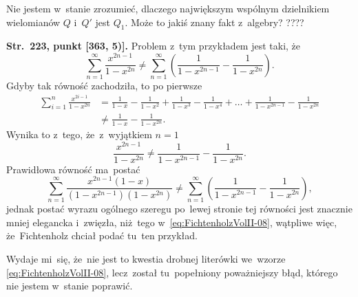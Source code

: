 \documentclass[a4paper,11pt]{article}
\numberwithin{equation}{section}
\begin{document}
\VerSpaceFour





\noindent
{} Nie jestem w~stanie zrozumieć, dlaczego największym
wspólnym dzielnikiem wielomianów $Q$ i~$Q'$ jest $Q_{ 1 }$. Może to
jakiś znany fakt z~algebry? ????

\VerSpaceFour





\noindent
\textbf{Str.~223, punkt [363, 5)].} Problem z~tym przykładem
jest taki, że
\begin{equation}
  \label{eq:FichtenholzVolII-08}
  \sum_{ n = 1 }^{ \infty } \frac{ x^{ 2n - 1 } }{ 1 - x^{ 2n } }
  \neq \sum_{ n = 1 }^{ \infty } \left( \frac{ 1 }{ 1 - x^{ 2n - 1 } }
    - \frac{ 1 }{ 1 - x^{ 2n } } \right).
\end{equation}
Gdyby tak równość zachodziła, to po pierwsze
\begin{equation}
  \label{eq:FichtenholzVolII-09}
  \begin{split}
    \sum_{ i = 1 }^{ n } \frac{ x^{ 2i - 1 } }{ 1 - x^{ 2n } }
    &=
      \frac{ 1 }{ 1 - x } - \frac{ 1 }{ 1 - x^{ 2 } }
      + \frac{ 1 }{ 1 - x^{ 3 } } - \frac{ 1 }{ 1 - x^{ 4 } }
      + \ldots + \frac{ 1 }{ 1 - x^{ 2n - 1 } }
      - \frac{ 1 }{ 1 - x^{ 2n } } \\
    &\neq \frac{ 1 }{ 1 - x } - \frac{ 1 }{ 1 - x^{ 2n } }.
  \end{split}
\end{equation}
Wynika to z~tego, że~z~wyjątkiem $n = 1$
\begin{equation}
  \label{eq:FichtenholzVolII-10}
  \frac{ x^{ 2n - 1 } }{ 1 - x^{ 2n } } \neq
  \frac{ 1 }{ 1 - x^{ 2n - 1 } } - \frac{ 1 }{ 1 - x^{ 2n } }.
\end{equation}
Prawidłowa równość ma~postać
\begin{equation}
  \label{eq:FichtenholzVolII-11}
  \sum_{ n = 1 }^{ \infty } \frac{ x^{ 2n - 1 } ( 1 - x ) }{ ( 1 - x^{ 2n - 1 } )
    ( 1 - x^{ 2n } ) }
  \neq
  \sum_{ n = 1 }^{ \infty } \left( \frac{ 1 }{ 1 - x^{ 2n - 1 } }
    - \frac{ 1 }{ 1 - x^{ 2n } } \right),
\end{equation}
jednak postać wyrazu ogólnego szeregu po~lewej stronie tej równości
jest znacznie mniej elegancka i~zwięzła, niż~tego
w~\eqref{eq:FichtenholzVolII-08}, wątpliwe więc, że~Fichtenholz chciał
podać tu~ten przykład.

Wydaje mi~się, że~nie jest to kwestia drobnej literówki we~wzorze
\eqref{eq:FichtenholzVolII-08}, lecz~został tu~popełniony poważniejszy
błąd, którego nie jestem w~stanie poprawić.
\end{document}
